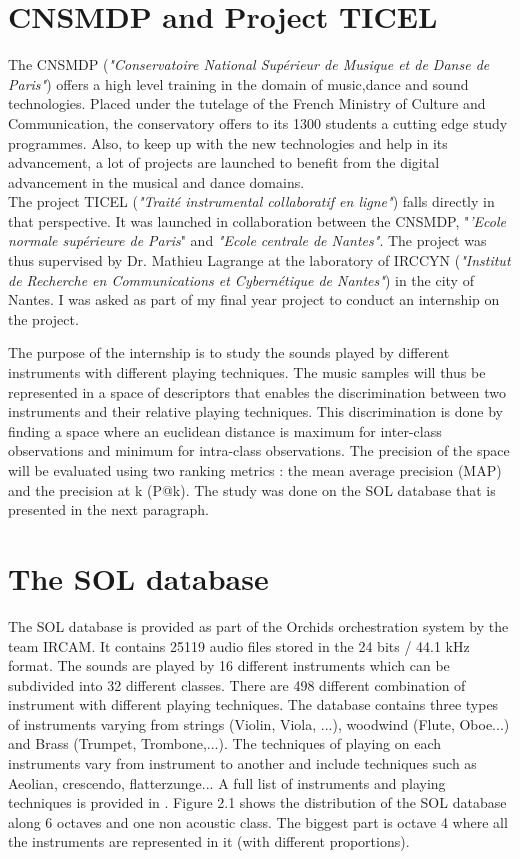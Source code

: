 \documentclass[hidelinks,12pt]{report}
\begin{document}
\section{CNSMDP and Project TICEL}
The CNSMDP  (\textit{"Conservatoire National Supérieur de Musique et de Danse de Paris"}) offers a high level training in the domain of music,dance and sound technologies. Placed under the tutelage of the French Ministry of Culture and Communication, the conservatory offers to its 1300 students a cutting edge study programmes. Also, to keep up with the new technologies and help in its advancement, a lot of projects are launched to benefit from the digital advancement in the musical and dance domains. \\
The project TICEL (\textit{"Traité instrumental collaboratif en ligne"}) falls directly in that perspective. It was launched in collaboration between the CNSMDP, "\textit{'Ecole normale supérieure de Paris}" and \textit{"Ecole centrale de Nantes"}. The project was thus supervised by Dr. Mathieu Lagrange at the laboratory of IRCCYN (\textit{"Institut de Recherche en Communications et Cybernétique de Nantes"}) in the city of Nantes. I was asked as part of my final year project to conduct an internship on the project. \par
The purpose of the internship is to study the sounds played by different instruments with different playing techniques. The music samples will thus be represented in a space of descriptors that enables the  discrimination between two instruments and their relative playing techniques. This discrimination is done by finding a space where an euclidean distance is maximum for inter-class observations and minimum for intra-class observations. The precision of the space will be evaluated using two ranking metrics : the mean average precision (MAP) and the precision at k (P@k). The study was done on the SOL database that is presented in the next paragraph.  \\ 

\section{The SOL database}
The SOL database is provided as part of the Orchids orchestration system by the team IRCAM. It contains 25119 audio files stored in the 24 bits / 44.1 kHz format. The sounds are played by 16 different instruments which can be subdivided into 32 different classes. There are 498 different combination of instrument with different playing techniques. The database contains three types of instruments varying from strings (Violin, Viola, ...), woodwind (Flute, Oboe...) and Brass (Trumpet, Trombone,...). The techniques of playing on each instruments vary from instrument to another and include techniques such as Aeolian, crescendo, flatterzunge... A full list of instruments and playing techniques is provided in \cite{SOL}.
Figure 2.1 shows the distribution of the SOL database along 6 octaves and one non acoustic class. The biggest part is octave 4 where all the instruments are represented in it (with different proportions).
\end{document}
